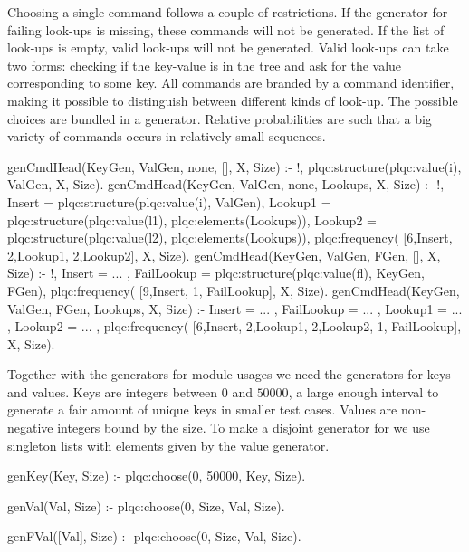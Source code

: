 Choosing a single command follows a couple of restrictions.
%
If the generator for failing look-ups is missing, these commands will
not be generated.
%
If the list of look-ups is empty, valid look-ups will not be generated.
%
Valid look-ups can take two forms: checking if the key-value is in the
tree and ask for the value corresponding to some key.
%
All commands are branded by a command identifier, making it possible to
distinguish between different kinds of look-up.
%
The possible choices are bundled in a  generator.
%
Relative probabilities are such that a big variety of commands occurs in
relatively small sequences.
%
\begin{yapcode}
 genCmdHead(KeyGen, ValGen, none,
           [], X, Size) :- !,
   plqc:structure({plqc:value(i), ValGen},
                  X, Size).
 genCmdHead(KeyGen, ValGen, none,
            Lookups, X, Size) :- !,
   Insert =
     plqc:structure({plqc:value(i),
                     ValGen}),
   Lookup1 =
     plqc:structure({plqc:value(l1),
                     plqc:elements(Lookups)}),
   Lookup2 =
     plqc:structure({plqc:value(l2),
                     plqc:elements(Lookups)}),
   plqc:frequency(
     [{6,Insert}, {2,Lookup1}, {2,Lookup2}],
     X, Size).
 genCmdHead(KeyGen, ValGen, FGen,
            [], X, Size) :- !,
   Insert = ... ,
   FailLookup =
     plqc:structure({plqc:value(fl),
                     {KeyGen, FGen}}),
   plqc:frequency(
     [{9,Insert}, {1, FailLookup}],
     X, Size).
 genCmdHead(KeyGen, ValGen, FGen,
            Lookups, X, Size) :-
   Insert = ... ,
   FailLookup = ... ,
   Lookup1 = ... ,
   Lookup2 = ... ,
   plqc:frequency(
     [{6,Insert}, {2,Lookup1},
       {2,Lookup2}, {1, FailLookup}],
     X, Size).
\end{yapcode}


Together with the generators for module usages we need the generators
for keys and values.
%
Keys are integers between $0$ and $50000$, a large enough interval to
generate a fair amount of unique keys in smaller test cases.
%
Values are non-negative integers bound by the size.
%
To make a disjoint generator for we use singleton lists with elements
given by the value generator.
\begin{yapcode}
 genKey(Key, Size) :-
   plqc:choose(0, 50000, Key, Size).

 genVal(Val, Size) :-
   plqc:choose(0, Size, Val, Size).

 genFVal([Val], Size) :-
   plqc:choose(0, Size, Val, Size).
\end{yapcode}


